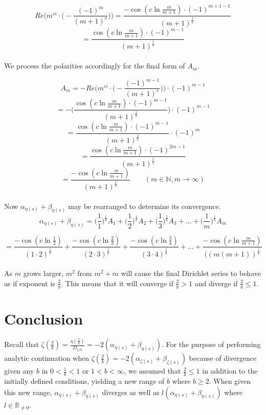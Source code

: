 \documentclass{amsart}
\begin{document}
	\[ Re\Bigg(m^{ci} {\cdot} \Big(-\frac{(-1)^{m}}{(m+1)^s}\Big) \Bigg) = \frac{-\cos(c \ln \frac{m}{m+1}){\cdot}(-1)^{m+1-1}}{(m+1)^{\frac{1}{b}}}  \]
	\[= \frac{\cos(c \ln \frac{m}{m+1}){\cdot}(-1)^{m-1}}{(m+1)^{\frac{1}{b}}} \]
	\\
	We process the polarities accordingly for the final form of $A_m$.
	
	\[ A_m = - Re\Bigg(m^{ci} {\cdot} \Big(-\frac{(-1)^{m-1}}{(m+1)^s}\Big) \Bigg) {\cdot} (-1)^{m-1} \]
	\[ = -\Bigg( \frac{\cos(c \ln \frac{m}{m+1}){\cdot}(-1)^{m-1}}{(m+1)^{\frac{1}{b}}} \Bigg) {\cdot} (-1)^{m-1} \]
	\[ = \frac{\cos(c \ln \frac{m}{m+1}){\cdot}(-1)^{m-1}}{(m+1)^{\frac{1}{b}}} {\cdot} (-1)^{m} \]
	\[ =  \frac{\cos(c \ln \frac{m}{m+1}){\cdot}(-1)^{2m-1}}{(m+1)^{\frac{1}{b}}}  \]
	\[ =  \frac{-\cos(c \ln \frac{m}{m+1})}{(m+1)^{\frac{1}{b}}} \qquad (m \in \mathbb{N}, m \to \infty) \]
	\[\]
	\\
	Now $\alpha_{\eta(s)} + \beta_{\eta(s)}$ may be rearranged to determine its convergence.
	\[ \alpha_{\eta(s)} + \beta_{\eta(s)} = \Big(\frac{1}{1}\Big)^{\frac{1}{b}}A_1 + \Big(\frac{1}{2}\Big)^{\frac{1}{b}}A_2 + \Big(\frac{1}{3}\Big)^{\frac{1}{b}}A_3 + \dots + \Big(\frac{1}{m}\Big)^{\frac{1}{b}}A_m \]
	
	\[ = \frac{-\cos(c \ln \frac{1}{2})}{(1{\cdot}2)^{\frac{1}{b}}} + \frac{-\cos(c \ln \frac{2}{3})}{(2{\cdot}3)^{\frac{1}{b}}} + \frac{-\cos(c \ln \frac{3}{4})}{(3{\cdot}4)^{\frac{1}{b}}} + \dots + \frac{-\cos(c \ln \frac{m}{m+1})}{((m(m+1))^{\frac{1}{b}}} \]
	\\
	
	As $m$ grows larger, $m^2$ from $m^2+m$ will cause the final Dirichlet series to behave as if exponent is $\frac{2}{b}$. This means that it will converge if $\frac{2}{b} > 1$ and diverge if $\frac{2}{b} \leq 1$. 
	
	\section{Conclusion}
	Recall that $\zeta(\frac{2}{b}) = \frac{\eta( \frac{2}{b} )}{D_{2/b}} = -2(\alpha_{\eta(s)} + \beta_{\eta(s)}) $. For the purpose of performing analytic continuation when $\zeta(\frac{2}{b}) = -2(\alpha_{\zeta(s)} + \beta_{\zeta(s)})$ because of divergence given any $b$ in $0 < \frac{1}{b} < 1$ or $1 < b < \infty$, we assumed that $\frac{2}{b} \leq 1$ in addition to the initially defined conditions, yielding a new range of $b$ where $b \geq 2$. When given this new range, $\alpha_{\eta(s)} + \beta_{\eta(s)}$ diverges as well as $l(\alpha_{\eta(s)} + \beta_{\eta(s)})$ where $l \in \mathbb{R}_{\neq 0}$.
	\\
	
\end{document}
